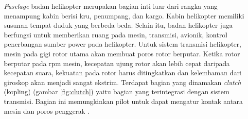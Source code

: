 \textit{Fuselage} badan helikopter merupakan bagian inti luar dari rangka yang menampung kabin berisi kru, penumpang, dan kargo. Kabin helikopter memiliki susunan tempat duduk yang berbeda-beda. Selain itu, badan helikopter juga berfungsi untuk memberikan ruang pada mesin, transmisi, avionik, kontrol penerbangan sumber power pada helikopter. Untuk sistem transmisi helikopter, mesin pada gigi rotor utama akan membuat poros rotor berputar. Ketika rotor berputar pada rpm mesin, kecepatan ujung rotor akan lebih cepat daripada kecepatan suara, kekuatan pada rotor harus ditingkatkan dan kelembaman dari giroskop akan menjadi sangat ekstrim. Terdapat bagian yang dinamakan \textit{clutch} (kopling) (gambar \ref{fig:clutch}) yaitu bagian yang terintegrasi dengan sistem transmisi. Bagian ini memungkinkan pilot untuk dapat mengatur kontak antara mesin dan poros penggerak \cite{wagtendonk2006principles}.

